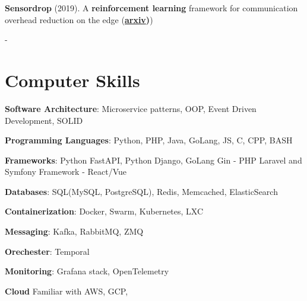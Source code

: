 \documentclass[
	10pt, %
]{FreemanCV}
\begin{document}
\begin{paracol}{2}
\textbf{Sensordrop} (2019). A \textbf{reinforcement learning} framework for communication overhead reduction on the edge (\textbf{\href{https://arxiv.org/pdf/1910.01601.pdf}{arxiv})})

\medskip %

-

\section{Computer Skills} 



\begin{tightitemize}
			\vspace{2pt}
	\item{
		{\textbf{Software Architecture}: Microservice patterns, OOP, Event Driven Development, SOLID}

	}
		\vspace{2pt}
	\item{
		{\textbf{Programming Languages}: Python, PHP, Java, GoLang, JS, C, CPP, BASH}
	}
		\vspace{2pt}
	\item{
		{\textbf{Frameworks}: Python FastAPI, Python Django, GoLang Gin - PHP Laravel and Symfony Framework - React/Vue }
	}
		\vspace{2pt}
	\item{
		{\textbf{Databases}: SQL(MySQL, PostgreSQL), Redis, Memcached, ElasticSearch }
	}
		\vspace{2pt}
	\item{
		{\textbf{Containerization}: Docker, Swarm, Kubernetes, LXC }
	}
		\vspace{2pt}
	\item{
		{\textbf{Messaging}: Kafka, RabbitMQ, ZMQ}
	}
		\vspace{2pt}
\item{
	{\textbf{Orechester}: Temporal}
}
		\vspace{2pt}
\item{
	{\textbf{Monitoring}: Grafana stack, OpenTelemetry}
}
	\vspace{2pt}
	\item{
		\textbf{Cloud} Familiar with AWS, GCP,
	}
\end{tightitemize}



\end{paracol} %

\end{document}
